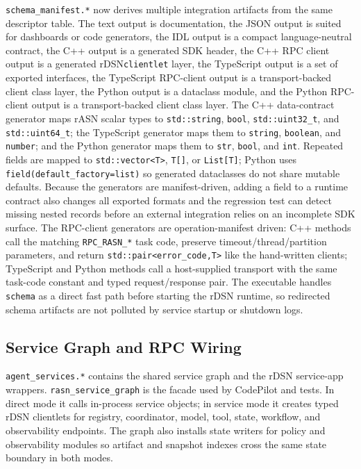 \documentclass[manuscript,screen,review]{acmart}
\newcommand{\rdsn}{rDSN\xspace}
\newcommand{\codepilot}{CodePilot\xspace}
\begin{document}
\texttt{schema\_manifest.*} now derives multiple integration artifacts from the
same descriptor table. The text output is documentation, the JSON output is
suited for dashboards or code generators, the IDL output is a compact
language-neutral contract, the C++ output is a generated SDK header, the C++ RPC
client output is a generated \rdsn \texttt{clientlet} layer, the TypeScript
output is a set of exported interfaces, the TypeScript RPC-client output is a
transport-backed client class layer, the Python output is a dataclass module,
and the Python RPC-client output is a transport-backed client class layer. The
C++ data-contract generator maps rASN scalar types to
\texttt{std::string}, \texttt{bool}, \texttt{std::uint32\_t}, and
\texttt{std::uint64\_t}; the TypeScript generator maps them to
\texttt{string}, \texttt{boolean}, and \texttt{number}; and the Python generator
maps them to \texttt{str}, \texttt{bool}, and \texttt{int}. Repeated fields are
mapped to \texttt{std::vector<T>}, \texttt{T[]}, or \texttt{List[T]}; Python
uses \texttt{field(default\_factory=list)} so generated dataclasses do not share
mutable defaults. Because the generators are manifest-driven, adding a field to
a runtime contract also changes all exported formats and the regression test can
detect missing nested records before an external integration relies on an
incomplete SDK surface. The RPC-client generators are operation-manifest driven:
C++ methods call the matching \texttt{RPC\_RASN\_*} task code, preserve
timeout/thread/partition parameters, and return
\texttt{std::pair<error\_code,T>} like the hand-written clients; TypeScript and
Python methods call a host-supplied transport with the same task-code constant
and typed request/response pair. The
executable handles \texttt{schema} as a direct fast path before starting the
\rdsn runtime, so redirected schema artifacts are not polluted by service
startup or shutdown logs.

\subsection{Service Graph and RPC Wiring}

\texttt{agent\_services.*} contains the shared service graph and the rDSN
service-app wrappers. \texttt{rasn\_service\_graph} is the facade used by
\codepilot and tests. In direct mode it calls in-process service objects; in
service mode it creates typed \rdsn clientlets for registry, coordinator, model,
tool, state, workflow, and observability endpoints. The graph also installs
state writers for policy and observability modules so artifact and snapshot
indexes cross the same state boundary in both modes.
\end{document}
